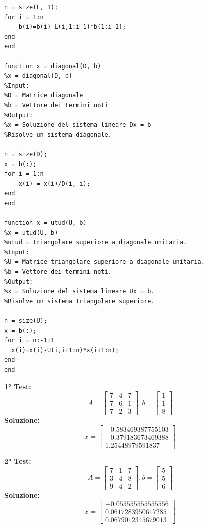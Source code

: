\documentclass[10pt,a4paper]{article}
\begin{document}
\begin{lstlisting}[style=Matlab-editor]
n = size(L, 1);
for i = 1:n
    b(i)=b(i)-L(i,1:i-1)*b(1:i-1);
end
end
    
function x = diagonal(D, b)
%x = diagonal(D, b)
%Input:
%D = Matrice diagonale
%b = Vettore dei termini noti
%Output:
%x = Soluzione del sistema lineare Dx = b
%Risolve un sistema diagonale.

n = size(D);
x = b(:);
for i = 1:n
    x(i) = x(i)/D(i, i);
end
end
    
function x = utud(U, b)
%x = utud(U, b)
%utud = triangolare superiore a diagonale unitaria.
%Input:
%U = Matrice triangolare superiore a diagonale unitaria.
%b = Vettore dei termini noti.
%Output:
%x = Soluzione del sistema lineare Ux = b.
%Risolve un sistema triangolare superiore.

n = size(U);
x = b(:);
for i = n:-1:1
  x(i)=x(i)-U(i,i+1:n)*x(i+1:n);
end
end
\end{lstlisting}

\textbf{1° Test:}
\[
  A =
  \begin{bmatrix}
    7 & 4 & 7 \\
    7 & 6 & 1 \\
    7 & 2 & 3
  \end{bmatrix},
  b =
  \begin{bmatrix}
    1 \\ 1 \\ 8
  \end{bmatrix}
\]
\textbf{Soluzione:}
\[
  x =
  \begin{bmatrix}
    -0.583469387755103 \\
    -0.379183673469388 \\
    1.25448979591837
  \end{bmatrix}
\]

\textbf{2° Test:}
\[
  A =
  \begin{bmatrix}
    7 & 1 & 7 \\
    3 & 4 & 8 \\
    9 & 4 & 2
  \end{bmatrix},
  b =
  \begin{bmatrix}
    5 \\ 5 \\ 6
  \end{bmatrix}
\]
\textbf{Soluzione:}
\[
  x =
  \begin{bmatrix}
    -0.055555555555556 \\
    0.0617283950617285 \\
    0.0679012345679013
  \end{bmatrix}
\]
\end{document}
